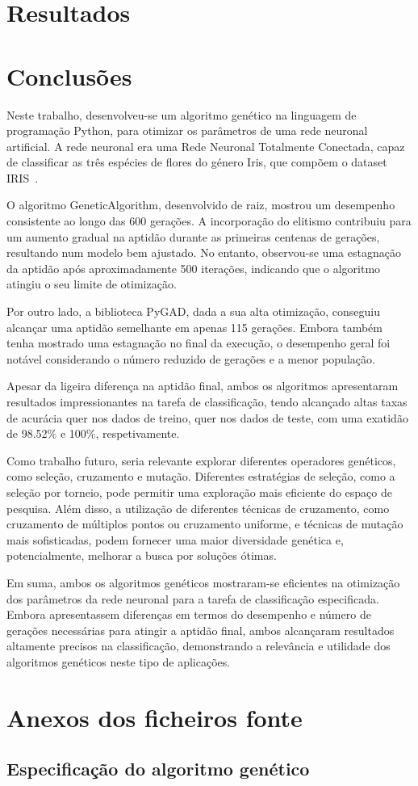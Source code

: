 \documentclass[a4paper, portuguese]{report}
\begin{document}
    \chapter{Resultados}\label{ch:results}
    


    \chapter{Conclusões}\label{ch:conclusoes}
    Neste trabalho, desenvolveu-se um algoritmo genético na linguagem de programação Python, para otimizar os parâmetros de uma rede neuronal artificial.
    A rede neuronal era uma Rede Neuronal Totalmente Conectada, capaz de classificar as três espécies de flores do género Iris, que compõem o dataset IRIS~\cite{Fisher1988}.

    O algoritmo GeneticAlgorithm, desenvolvido de raiz, mostrou um desempenho consistente ao longo das 600 gerações.
    A incorporação do elitismo contribuiu para um aumento gradual na aptidão durante as primeiras centenas de gerações, resultando num modelo bem ajustado.
    No entanto, observou-se uma estagnação da aptidão após aproximadamente 500 iterações, indicando que o algoritmo atingiu o seu limite de otimização.

    Por outro lado, a biblioteca PyGAD, dada a sua alta otimização, conseguiu alcançar uma aptidão semelhante em apenas 115 gerações.
    Embora também tenha mostrado uma estagnação no final da execução, o desempenho geral foi notável considerando o número reduzido de gerações e a menor população.

    Apesar da ligeira diferença na aptidão final, ambos os algoritmos apresentaram resultados impressionantes na tarefa de classificação, tendo alcançado altas taxas de acurácia quer nos dados de treino, quer nos dados de teste, com uma exatidão de 98.52\% e 100\%, respetivamente.

    Como trabalho futuro, seria relevante explorar diferentes operadores genéticos, como seleção, cruzamento e mutação.
    Diferentes estratégias de seleção, como a seleção por torneio, pode permitir uma exploração mais eficiente do espaço de pesquisa.
    Além disso, a utilização de diferentes técnicas de cruzamento, como cruzamento de múltiplos pontos ou cruzamento uniforme, e técnicas de mutação mais sofisticadas, podem fornecer uma maior diversidade genética e, potencialmente, melhorar a busca por soluções ótimas.

    Em suma, ambos os algoritmos genéticos mostraram-se eficientes na otimização dos parâmetros da rede neuronal para a tarefa de classificação especificada.
    Embora apresentassem diferenças em termos do desempenho e número de gerações necessárias para atingir a aptidão final, ambos alcançaram resultados altamente precisos na classificação, demonstrando a relevância e utilidade dos algoritmos genéticos neste tipo de aplicações.

    \appendix


    \chapter{Anexos dos ficheiros fonte}\label{ch:appendix}


    \section{Especificação do algoritmo genético}\label{sec:model_spec}
    \inputminted[breaklines]{python}{../src/genalg.py}
    
    
\end{document}
